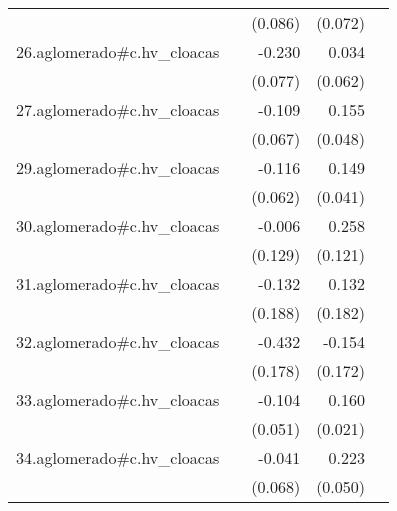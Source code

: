 {\begin{longtable}{l*{4}{D{.}{.}{-1}}}
            &                     &     (0.086)         &     (0.072)         &                     \\
\addlinespace
26.aglomerado#c.hv\_cloacas&                     &      -0.230\sym{**} &       0.034         &                     \\
            &                     &     (0.077)         &     (0.062)         &                     \\
\addlinespace
27.aglomerado#c.hv\_cloacas&                     &      -0.109         &       0.155\sym{**} &                     \\
            &                     &     (0.067)         &     (0.048)         &                     \\
\addlinespace
29.aglomerado#c.hv\_cloacas&                     &      -0.116         &       0.149\sym{***}&                     \\
            &                     &     (0.062)         &     (0.041)         &                     \\
\addlinespace
30.aglomerado#c.hv\_cloacas&                     &      -0.006         &       0.258\sym{*}  &                     \\
            &                     &     (0.129)         &     (0.121)         &                     \\
\addlinespace
31.aglomerado#c.hv\_cloacas&                     &      -0.132         &       0.132         &                     \\
            &                     &     (0.188)         &     (0.182)         &                     \\
\addlinespace
32.aglomerado#c.hv\_cloacas&                     &      -0.432\sym{*}  &      -0.154         &                     \\
            &                     &     (0.178)         &     (0.172)         &                     \\
\addlinespace
33.aglomerado#c.hv\_cloacas&                     &      -0.104\sym{*}  &       0.160\sym{***}&                     \\
            &                     &     (0.051)         &     (0.021)         &                     \\
\addlinespace
34.aglomerado#c.hv\_cloacas&                     &      -0.041         &       0.223\sym{***}&                     \\
            &                     &     (0.068)         &     (0.050)         &                     \\

\end{longtable}}
